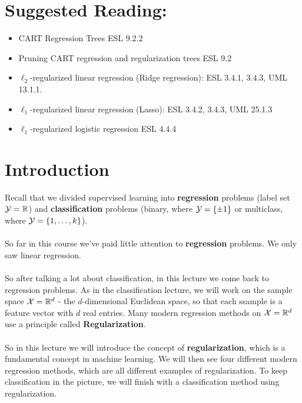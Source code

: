 \section*{Suggested Reading:}
\begin{itemize}
  \item CART Regression Trees ESL 9.2.2
  \item Pruning CART regression and regularization trees ESL 9.2
  \item $\ell_2$-regularized linear regression (Ridge regression): ESL 3.4.1,
    3.4.3, UML 13.1.1.
  \item $\ell_1$-regularized linear regression (Lasso): ESL 3.4.2, 3.4.3, UML
    25.1.3
  \item $\ell_1$-regularized logistic regression ESL 4.4.4
\end{itemize}


\section{Introduction}

Recall that we divided supervised learning into {\bf regression} problems 
(label set $\mathcal{Y}=\mathbb{R}$) and {\bf classification} problems (binary, where $\mathcal{Y}=\left\{ \pm 1
\right\}$ or multiclass, where $\mathcal{Y}=\left\{ 1,\ldots, k \right\}$).
\\~\\
So far in this course we've paid little attention to
{\bf regression} problems. We only saw linear regression.
\\~\\
So after talking a lot about classification, in this lecture we come back to
regression problems. As in the classification lecture, we will work on the
sample space $\mathcal{X}=\mathbb{R}^d$ - the $d$-dimensional Euclidean space, so that each
ssample is a feature vector with $d$ real entries. 
Many modern regression methods on $\mathcal{X}=\mathbb{R}^d$ use a principle called {\bf
Regularization}. 
\\~\\
So in this lecture we will introduce the concept of
{\bf regularization}, which is a fundamental concept in machine learning.
We will then see
four different modern regression methods, which are all different examples
of regularization. To keep classification in the picture, we will finish with a
classification method using regularization. 

